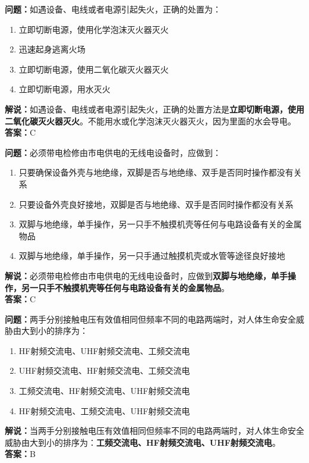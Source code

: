 \bigskip


\noindent\textbf{问题：}如遇设备、电线或者电源引起失火，正确的处置为：
\begin{enumerate}[label=\Alph*), leftmargin=3em]
	\item 立即切断电源，使用化学泡沫灭火器灭火
	\item 迅速起身逃离火场
	\item 立即切断电源，使用二氧化碳灭火器灭火
	\item 立即切断电源，用水灭火
\end{enumerate}
\noindent\textbf{解说：}如遇设备、电线或者电源引起失火，正确的处置方法是\textbf{立即切断电源，使用二氧化碳灭火器灭火}。不能用水或化学泡沫灭火器灭火，因为里面的水会导电。\\\noindent\textbf{答案：}C

\bigskip


\noindent\textbf{问题：}必须带电检修由市电供电的无线电设备时，应做到：
\begin{enumerate}[label=\Alph*), leftmargin=3em]
	\item 只要确保设备外壳与地绝缘，双脚是否与地绝缘、双手是否同时操作都没有关系
	\item 只要设备外壳良好接地，双脚是否与地绝缘、双手是否同时操作都没有关系
	\item 双脚与地绝缘，单手操作，另一只手不触摸机壳等任何与电路设备有关的金属物品
	\item 双脚与地绝缘，单手操作，另一只手通过触摸机壳或水管等途径良好接地
\end{enumerate}
\noindent\textbf{解说：}必须带电检修由市电供电的无线电设备时，应做到\textbf{双脚与地绝缘，单手操作，另一只手不触摸机壳等任何与电路设备有关的金属物品}。\\\noindent\textbf{答案：}C
\bigskip


\noindent\textbf{问题：}两手分别接触电压有效值相同但频率不同的电路两端时，对人体生命安全威胁由大到小的排序为：
\begin{enumerate}[label=\Alph*), leftmargin=3em]
	\item HF射频交流电、UHF射频交流电、工频交流电
	\item UHF射频交流电、HF射频交流电、工频交流电
	\item 工频交流电、HF射频交流电、UHF射频交流电
	\item HF射频交流电、工频交流电、UHF射频交流电
\end{enumerate}
\noindent\textbf{解说：}当两手分别接触电压有效值相同但频率不同的电路两端时，对人体生命安全威胁由大到小的排序为：\textbf{工频交流电、HF射频交流电、UHF射频交流电}。\\\noindent\textbf{答案：}B%

